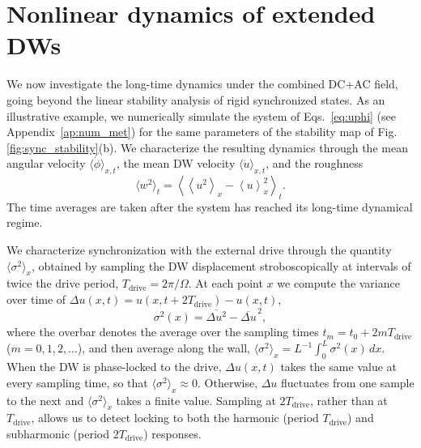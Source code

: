 \documentclass[prb,aps,twocolumn,superscriptaddress,floatfix]{revtex4-1}
\newcommand{\aleadd}[1]{{\color{blue}#1}}
\newcommand{\luzcom}[1]{{\color{green!50!black}#1}}
\begin{document}
\aleadd{
\section{Nonlinear dynamics of extended DWs}

We now investigate the long-time dynamics under the combined DC+AC field, going beyond the linear stability analysis of rigid synchronized states. As an illustrative example, we numerically simulate the system of Eqs.~\eqref{eq:uphi} (see Appendix~\ref{ap:num_met}) for the same parameters of the stability map of Fig. \ref{fig:sync_stability}(b). We characterize the resulting dynamics through the mean angular velocity $\langle\dot\phi\rangle_{x,t}$, the mean DW velocity $\langle\dot u\rangle_{x,t}$, and the roughness
%
\begin{equation}
\langle w^2\rangle_t =
\left\langle
\left\langle u^2\right\rangle_x
-\left\langle u\right\rangle_x^2
\right\rangle_t .
\label{eq:roughnessvst}
\end{equation}
%
The time averages are taken after the system has reached its long-time dynamical regime.}

\aleadd{
We characterize synchronization with the external drive through the quantity
$\langle\sigma^2\rangle_x$, obtained by sampling the DW displacement
stroboscopically at intervals of twice the drive period,
$T_\text{drive}=2\pi/\Omega$. At each point $x$ we compute the variance over time of
$\Delta u(x,t)=u(x,t+2T_\text{drive})-u(x,t)$,
\begin{equation}
  \sigma^2(x)=\overline{\Delta u^{2}}-\overline{\Delta u}^{\,2},
\end{equation}
where the overbar denotes the average over the sampling times
$t_m=t_0+2mT_\text{drive}$ ($m=0,1,2,\dots$), and then average along the wall,
$\langle\sigma^2\rangle_x=L^{-1}\!\int_0^L\sigma^2(x)\,dx$.
When the DW is phase-locked to the drive, $\Delta u(x,t)$ takes the same value
at every sampling time, so that $\langle\sigma^2\rangle_x\approx 0$. Otherwise,
$\Delta u$ fluctuates from one sample to the next and $\langle\sigma^2\rangle_x$
takes a finite value. Sampling at $2T_\text{drive}$, rather than at $T_\text{drive}$,
allows us to detect locking to both the harmonic (period $T_\text{drive}$) and
subharmonic (period $2T_\text{drive}$) responses.
}
\end{document}
